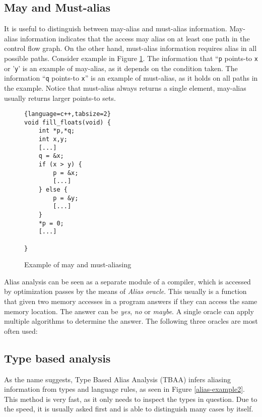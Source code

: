 \subsection{May and Must-alias}

It is useful to distinguish between may-alias and must-alias information.
May-alias information indicates that the access may alias on at least one path
in the control flow graph. On the other hand, must-alias information requires
alias in all possible paths. Consider example in Figure
\ref{alias-example-maymust}. The information that ``{\tt p} points-to {\tt x} or
'{\tt y}' is an example of may-alias, as it depends on the condition taken.
The information ``{\tt q} points-to {\tt x}'' is an example of must-alias, as it
holds on all paths in the example. Notice that must-alias always returns a
single element, may-alias usually returns larger points-to sets.

\begin{figure}[h!]
\label{alias-example-maymust}
\begin{tcolorbox}
\begin{lstlisting}{language=c++,tabsize=2}
void fill_floats(void) {
	int *p,*q;
	int x,y;
	[...]
	q = &x;
	if (x > y) {
		p = &x;
		[...]
	} else {
		p = &y;
		[...]
	}
	*p = 0;
	[...]
	
}
\end{lstlisting}
\end{tcolorbox}
\caption{Example of may and must-aliasing}
\end{figure}

Alias analysis can be seen as a separate module of a compiler, which is accessed
by optimization passes by the means of {\it Alias oracle}. This usually is a
function that given two memory accesses in a program answers if they can access
the same memory location. The answer can be {\it yes}, {\it no} or {\it maybe}.
A single oracle can apply multiple algorithms to determine the answer. The
following three oracles are most often used:

\subsection{Type based analysis}

As the name suggests, Type Based Alias Analysis (TBAA) infers aliasing
information from types and language rules, as seen in Figure
\ref{alias-example2}. This method is very fast, as it only needs to inspect
the types in question. Due to the speed, it is usually asked first and is able
to distinguish many cases by itself.

